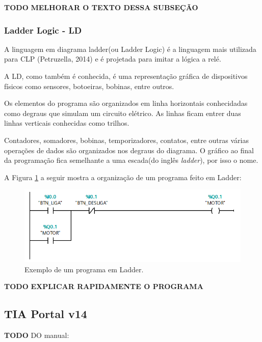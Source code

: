 \documentclass[a4paper, 12pt]{article}
\begin{document}
		\textbf{TODO}
		\textbf{MELHORAR O TEXTO DESSA SUBSEÇÃO}
		
		\subsubsection{Ladder Logic - LD}
		
			A linguagem em diagrama ladder(ou Ladder Logic) é a linguagem mais utilizada para CLP (Petruzella, 2014)
			e é projetada para imitar a lógica a relé.
		
			A LD, como também é conhecida, é uma representação gráfica de dispositivos físicos
			como sensores, botoeiras, bobinas, entre outros.
			
			Os elementos do programa são organizados em linha horizontais conhecidadas como
			degraus que simulam um circuito elétrico. As linhas ficam entrer duas linhas
			verticais conhecidas como trilhos.
			
			Contadores, somadores, bobinas, temporizadores, contatos, entre outras várias
			operações de dados são organizados nos degraus do diagrama.
			O gráfico ao final da programação fica semelhante a uma escada(do inglês \textit{ladder}), por isso o nome.
			
			A Figura \ref{fig:ladder_basic_example} a seguir mostra a organização de um programa feito em Ladder:
			
			\begin{figure}[H]
				\centering
				\includegraphics[scale=0.5]{figures/ladder_basic_example.png}
				\caption{Exemplo de um programa em Ladder.}
				\label{fig:ladder_basic_example}
			\end{figure}
			
			\textbf{TODO}
			\textbf{EXPLICAR RAPIDAMENTE O PROGRAMA}

	
	\subsection{TIA Portal v14}
	
		\textbf{TODO}
		DO manual:
		
\end{document}
